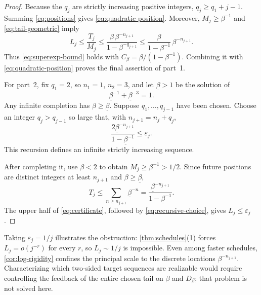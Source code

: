 \begin{proof}
Because the $q_j$ are strictly increasing positive integers,
$q_j\geq q_1+j-1$.  Summing \eqref{eq:positions} gives \eqref{eq:quadratic-position}.  Moreover, $M_j\geq\beta^{-1}$ and \eqref{eq:tail-geometric} imply
\[
 L_j\leq\frac{T_j}{M_j}
 \leq\frac{\beta\,\beta^{-n_{j+1}}}{1-\beta^{-q_{j+1}}}
 \leq\frac{\beta}{1-\beta^{-1}}\,\beta^{-n_{j+1}}.
\]
Thus \eqref{eq:superexp-bound} holds with $C_\beta=\beta/(1-\beta^{-1})$.  Combining it with \eqref{eq:quadratic-position} proves the final assertion of part~1.

For part~2, fix $q_1=2$, so $n_1=1$, $n_2=3$, and let $\underline\beta>1$ be the solution of
\[
 \underline\beta^{-1}+\underline\beta^{-3}=1.
\]
Any infinite completion has $\beta\geq\underline\beta$.  Suppose $q_1,\ldots,q_{j-1}$ have been chosen.  Choose an integer $q_j>q_{j-1}$ so large that, with $n_{j+1}=n_j+q_j$,
\begin{equation}
 \frac{2\underline\beta^{-n_{j+1}}}{1-\underline\beta^{-1}}
 \leq\varepsilon_j.
 \label{eq:recursive-choice}
\end{equation}
This recursion defines an infinite strictly increasing sequence.

After completing it, use $\beta<2$ to obtain $M_j\geq\beta^{-1}>1/2$.  Since future positions are distinct integers at least $n_{j+1}$ and $\beta\geq\underline\beta$,
\[
 T_j\leq\sum_{n\geq n_{j+1}}\underline\beta^{-n}
 =\frac{\underline\beta^{-n_{j+1}}}{1-\underline\beta^{-1}}.
\]
The upper half of \eqref{eq:certificate}, followed by \eqref{eq:recursive-choice}, gives $L_j\leq\varepsilon_j$.
\end{proof}

\begin{remark}
Taking $\varepsilon_j=1/j$ illustrates the obstruction: \cref{thm:schedules}(1) forces $L_j=o(j^{-r})$ for every $r$, so $L_j\sim1/j$ is impossible.  Even among faster schedules, \cref{cor:log-rigidity} confines the principal scale to the discrete locations $\beta^{-n_{j+1}}$.  Characterizing which two-sided target sequences are realizable would require controlling the feedback of the entire chosen tail on $\beta$ and $D_\beta$; that problem is not solved here.
\end{remark}
